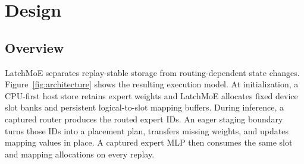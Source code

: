 \section{Design}
\label{sec:design}

\subsection{Overview}
\label{sec:design-overview}

LatchMoE separates replay-stable storage from routing-dependent state changes.
Figure~\ref{fig:architecture} shows the resulting execution model. At
initialization, a CPU-first host store retains expert weights and LatchMoE
allocates fixed device slot banks and persistent logical-to-slot mapping
buffers. During inference, a captured router produces the routed expert IDs.
An eager staging boundary turns those IDs into a placement plan, transfers
missing weights, and updates mapping values in place. A captured expert MLP
then consumes the same slot and mapping allocations on every replay.

